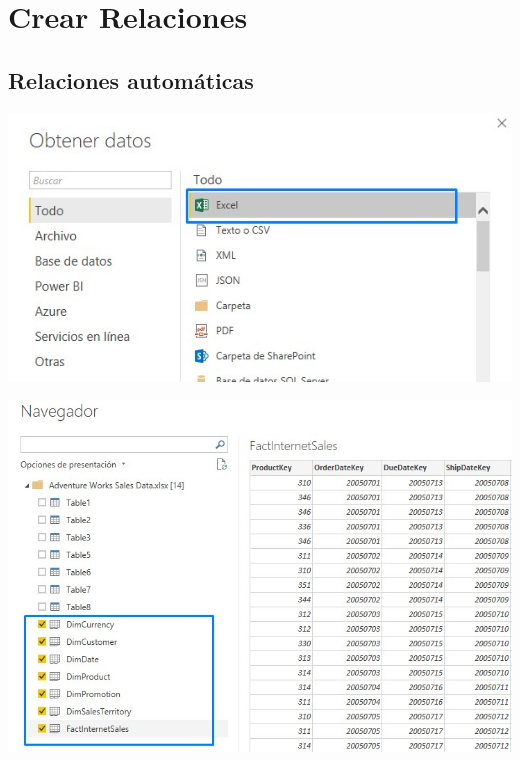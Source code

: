 \section{ Crear Relaciones}
\subsection{ Relaciones automáticas}

\begin{center}
\includegraphics[width=\columnwidth]{images/task1/task1-01}\newline
\end{center}

\begin{center}
\includegraphics[width=\columnwidth]{images/task1/task1-02}\newline
\end{center}

